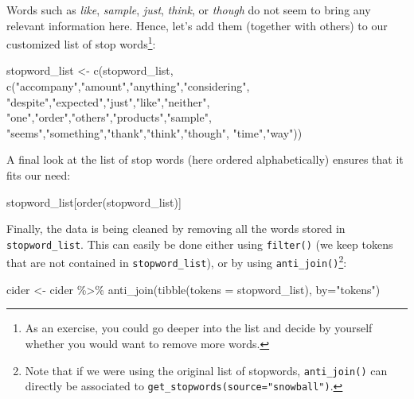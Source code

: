 \documentclass[
]{krantz}
\makeatletter
\newenvironment{Shaded}{\begin{snugshade}}{\end{snugshade}}
\newcommand{\AttributeTok}[1]{\textcolor[rgb]{0.61,0.61,0.61}{#1}}
\newcommand{\FunctionTok}[1]{\textcolor[rgb]{0,0,0}{#1}}
\newcommand{\NormalTok}[1]{#1}
\newcommand{\OtherTok}[1]{\textcolor[rgb]{0.37,0.37,0.37}{#1}}
\newcommand{\SpecialCharTok}[1]{\textcolor[rgb]{0,0,0}{#1}}
\newcommand{\StringTok}[1]{\textcolor[rgb]{0.5,0.5,0.5}{#1}}
\newenvironment{kframe}{%
\medskip{}
\setlength{\fboxsep}{.8em}
 \def\at@end@of@kframe{}%
 \ifinner\ifhmode%
  \def\at@end@of@kframe{\end{minipage}}%
  \begin{minipage}{\columnwidth}%
 \fi\fi%
 \def\FrameCommand##1{\hskip\@totalleftmargin \hskip-\fboxsep
 \colorbox{shadecolor}{##1}\hskip-\fboxsep
     \hskip-\linewidth \hskip-\@totalleftmargin \hskip\columnwidth}%
 \MakeFramed {\advance\hsize-\width
   \@totalleftmargin\z@ \linewidth\hsize
   \@setminipage}}%
 {\par\unskip\endMakeFramed%
 \at@end@of@kframe}
\renewenvironment{Shaded}{\begin{kframe}}{\end{kframe}}
\makeatother
\begin{document}
Words such as \emph{like}, \emph{sample}, \emph{just}, \emph{think}, or \emph{though} do not seem to bring any relevant information here. Hence, let's add them (together with others) to our customized list of stop words\footnote{As an exercise, you could go deeper into the list and decide by yourself whether you would want to remove more words.}:

\begin{Shaded}
\begin{Highlighting}[]
\NormalTok{stopword\_list }\OtherTok{\textless{}{-}} \FunctionTok{c}\NormalTok{(stopword\_list, }
                   \FunctionTok{c}\NormalTok{(}\StringTok{"accompany"}\NormalTok{,}\StringTok{"amount"}\NormalTok{,}\StringTok{"anything"}\NormalTok{,}\StringTok{"considering"}\NormalTok{,}
                     \StringTok{"despite"}\NormalTok{,}\StringTok{"expected"}\NormalTok{,}\StringTok{"just"}\NormalTok{,}\StringTok{"like"}\NormalTok{,}\StringTok{"neither"}\NormalTok{,}
                     \StringTok{"one"}\NormalTok{,}\StringTok{"order"}\NormalTok{,}\StringTok{"others"}\NormalTok{,}\StringTok{"products"}\NormalTok{,}\StringTok{"sample"}\NormalTok{,}
                     \StringTok{"seems"}\NormalTok{,}\StringTok{"something"}\NormalTok{,}\StringTok{"thank"}\NormalTok{,}\StringTok{"think"}\NormalTok{,}\StringTok{"though"}\NormalTok{,}
                     \StringTok{"time"}\NormalTok{,}\StringTok{"way"}\NormalTok{))}
\end{Highlighting}
\end{Shaded}

A final look at the list of stop words (here ordered alphabetically) ensures that it fits our need:

\begin{Shaded}
\begin{Highlighting}[]
\NormalTok{stopword\_list[}\FunctionTok{order}\NormalTok{(stopword\_list)]}
\end{Highlighting}
\end{Shaded}

Finally, the data is being cleaned by removing all the words stored in \texttt{stopword\_list}. This can easily be done either using \texttt{filter()} (we keep tokens that are not contained in \texttt{stopword\_list}), or by using \texttt{anti\_join()}\footnote{Note that if we were using the original list of stopwords, \texttt{anti\_join()} can directly be associated to \texttt{get\_stopwords(source="snowball")}.}:

\begin{Shaded}
\begin{Highlighting}[]
\NormalTok{cider }\OtherTok{\textless{}{-}}\NormalTok{ cider }\SpecialCharTok{\%\textgreater{}\%} 
  \FunctionTok{anti\_join}\NormalTok{(}\FunctionTok{tibble}\NormalTok{(}\AttributeTok{tokens =}\NormalTok{ stopword\_list), }\AttributeTok{by=}\StringTok{"tokens"}\NormalTok{)}
\end{Highlighting}
\end{Shaded}
\end{document}
